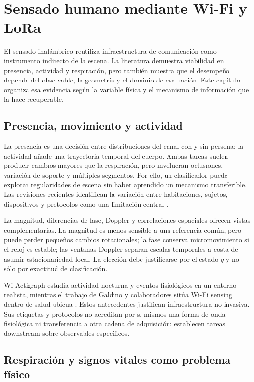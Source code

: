 \chapter{Sensado humano mediante Wi-Fi y LoRa}
\label{ch:sensado_wifi_lora}

El sensado inalámbrico reutiliza infraestructura de comunicación como instrumento
indirecto de la escena. La literatura demuestra viabilidad en presencia, actividad
y respiración, pero también muestra que el desempeño depende del observable, la
geometría y el dominio de evaluación. Este capítulo organiza esa evidencia según
la variable física y el mecanismo de información que la hace recuperable.

\section{Presencia, movimiento y actividad}

La presencia es una decisión entre distribuciones del canal con y sin persona; la
actividad añade una trayectoria temporal del cuerpo. Ambas tareas suelen producir
cambios mayores que la respiración, pero involucran oclusiones, variación de soporte
y múltiples segmentos. Por ello, un clasificador puede explotar regularidades de
escena sin haber aprendido un mecanismo transferible. Las revisiones recientes
identifican la variación entre habitaciones, sujetos, dispositivos y protocolos
como una limitación central \citep{Zhu2024Survey,Armenta2024Survey}.

La magnitud, diferencias de fase, Doppler y correlaciones espaciales ofrecen vistas
complementarias. La magnitud es menos sensible a una referencia común, pero puede
perder pequeños cambios rotacionales; la fase conserva micromovimiento si el reloj
es estable; las ventanas Doppler separan escalas temporales a costa de asumir
estacionariedad local. La elección debe justificarse por el estado $q$ y no sólo
por exactitud de clasificación.

Wi-Actigraph estudia actividad nocturna y eventos fisiológicos en un entorno
realista, mientras el trabajo de Galdino y colaboradores sitúa Wi-Fi sensing dentro
de salud ubicua \citep{Alzaabi2025WiActigraph,Galdino2023eHealth}. Estos antecedentes
justifican infraestructura no invasiva. Sus etiquetas y protocolos no acreditan
por sí mismos una forma de onda fisiológica ni transferencia a otra cadena de
adquisición; establecen tareas downstream sobre observables específicos.

\section{Respiración y signos vitales como problema físico}

